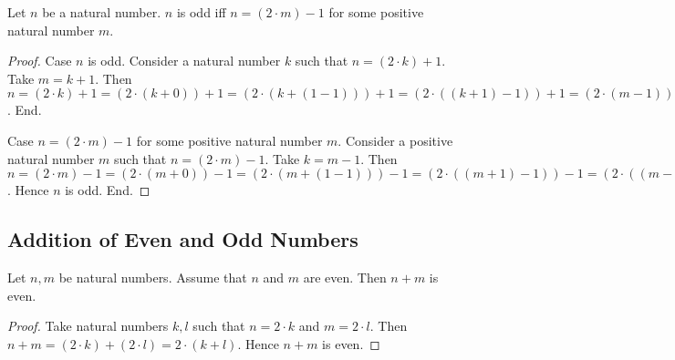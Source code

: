 \documentclass[10pt]{article}
\begin{document}
  \begin{forthel}
    \begin{proposition}[id=ARITHMETIC_15_1023652154254789,printid]
      Let $n$ be a natural number.
      $n$ is odd iff $n = (2 \cdot m) - 1$ for some positive natural number $m$.
    \end{proposition}
    \begin{proof}
      Case $n$ is odd.
        Consider a natural number $k$ such that $n = (2 \cdot k) + 1$.
        Take $m = k + 1$.
        Then $n
          = (2 \cdot k) + 1
          = (2 \cdot (k + 0)) + 1
          = (2 \cdot (k + (1 - 1))) + 1
          = (2 \cdot ((k + 1) - 1)) + 1
          = (2 \cdot (m - 1)) + 1
          = ((2 \cdot m) - (2 \cdot 1)) + 1
          = ((2 \cdot m) - 2) + 1
          = (2 \cdot m) - 1$.
      End.

      Case $n = (2 \cdot m) - 1$ for some positive natural number $m$.
        Consider a positive natural number $m$ such that $n = (2 \cdot m) - 1$.
        Take $k = m - 1$.
        Then $n
          = (2 \cdot m) - 1
          = (2 \cdot (m + 0)) - 1
          = (2 \cdot (m + (1 - 1))) - 1
          = (2 \cdot ((m + 1) - 1)) - 1
          = (2 \cdot ((m - 1) + 1)) - 1
          = (2 \cdot (k + 1)) - 1
          = ((2 \cdot k) + (2 \cdot 1)) - 1
          = ((2 \cdot k) + 2) - 1
          = (2 \cdot k) + (2 - 1)
          = (2 \cdot k) + 1$.
        Hence $n$ is odd.
      End.
    \end{proof}
  \end{forthel}


  \subsection*{Addition of Even and Odd Numbers}

  \begin{forthel}
    \begin{proposition}[id=ARITHMETIC_15_7845441256365256,printid]
      Let $n, m$ be natural numbers.
      Assume that $n$ and $m$ are even.
      Then $n + m$ is even.
    \end{proposition}
    \begin{proof}
      Take natural numbers $k, l$ such that $n = 2 \cdot k$ and $m = 2 \cdot l$.
      Then $n + m
        = (2 \cdot k) + (2 \cdot l)
        = 2 \cdot (k + l)$.
      Hence $n + m$ is even.
    \end{proof}
  \end{forthel}
\end{document}
